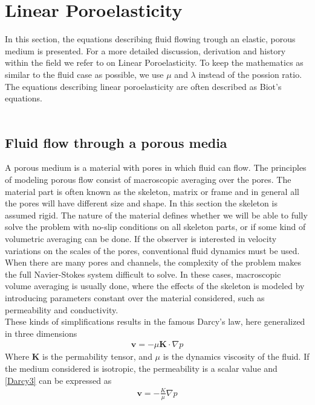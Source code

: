 \section{Linear Poroelasticity}
In this section, the equations describing fluid flowing trough an elastic, porous medium is presented. For a more detailed discussion, derivation and history within the field we refer to \cite{Wang00} on Linear Poroelasticity. To keep the mathematics as similar to the fluid case as possible, we use $\mu$ and $\lambda$ instead of the possion ratio. The equations describing linear poroelasticity are often described as Biot's equations. 
\\
\\
\subsection{Fluid flow through a porous media}
A porous medium is a material with pores in which fluid can flow. The principles of modeling porous flow consist of macroscopic averaging over the pores. The material part is often known as the skeleton, matrix or frame and in general all the pores will have different size and shape. In this section the skeleton is assumed rigid. The nature of the material defines whether we will be able to fully solve the problem with no-slip conditions on all skeleton parts, or if some kind of volumetric averaging can be done. If the observer is interested in velocity variations on the scales of the pores, conventional fluid dynamics must be used. When there are many pores and channels, the complexity of the problem makes the full Navier-Stokes system difficult to solve. In these cases, macroscopic volume averaging is usually done, where the effects of the skeleton is modeled by introducing parameters constant over the material considered, such as permeability and conductivity. 
\\
These kinds of simplifications results in the famous Darcy's law, here generalized in three dimensions
\begin{align}
\mathbf{v} = -\mu \mathbf{K} \cdot \nabla p \label{Darcy3}
\end{align}
Where $\mathbf{K}$ is the permability tensor, and $\mu$ is the dynamics viscosity of the fluid. If the medium considered is isotropic, the permeability is a scalar value and \eqref{Darcy3} can be expressed as
\begin{align}
\mathbf{v} = -\frac{K}{\mu} \nabla p \label{Darcy}
\end{align}
